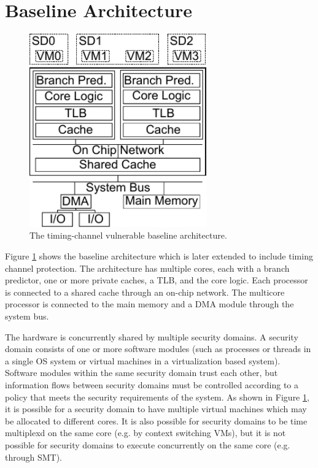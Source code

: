 \section{Baseline Architecture}

    \begin{figure}
        \begin{center}
            \includegraphics[width=3in]{figs/baseline.pdf}
            \caption{The timing-channel vulnerable baseline architecture.}
            \label{fig:baseline}
        \end{center}
    \end{figure}

    Figure \ref{fig:baseline} shows the baseline architecture which is later 
    extended to include timing channel protection. The architecture has 
    multiple cores, each with a branch predictor, one or more private caches, a 
    TLB, and the core logic. Each processor is connected to a shared cache 
    through an on-chip network. The multicore processor is connected to the 
    main memory and a DMA module through the system bus. 

    The hardware is concurrently shared by multiple security domains. A 
    security domain consists of one or more software modules (such as processes 
    or threads in a single OS system or virtual machines in a virtualization 
    based system). Software modules within the same security domain trust each 
    other, but information flows between security domains must be controlled 
    according to a policy that meets the security requirements of the system.
    As shown in Figure \ref{fig:baseline}, it is possible for a security domain 
    to have multiple virtual machines which may be allocated to different 
    cores. It is also possible for security domains to be time multiplexd on 
    the same core (e.g.  by context switching VMs), but it is not possible for 
    security domains to execute concurrently on the same core (e.g. through 
    SMT).

